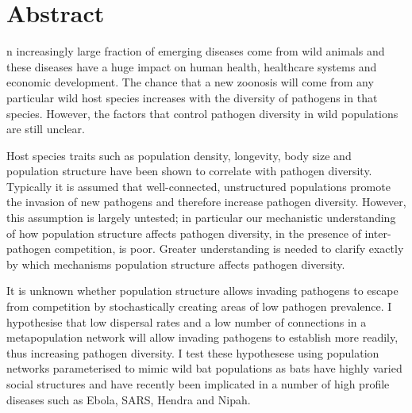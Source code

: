 
\clearpage









\section{Abstract}


n increasingly large fraction of emerging diseases come from wild animals and these diseases have a huge impact on human health, healthcare systems and economic development.
The chance that a new zoonosis will come from any particular wild host species increases with the diversity of pathogens in that species.
However, the factors that control pathogen diversity in wild populations are still unclear.




Host species traits such as population density, longevity, body size and population structure have been shown to correlate with pathogen diversity.
Typically it is assumed that well-connected, unstructured populations promote the invasion of new pathogens and therefore increase pathogen diversity. %
However, this assumption is largely untested; in particular our mechanistic understanding of how population structure affects pathogen diversity, in the presence of inter-pathogen competition, is poor.
Greater understanding is needed to clarify exactly by which mechanisms population structure affects pathogen diversity. 



It is unknown whether population structure allows invading pathogens to escape from competition by stochastically creating areas of low pathogen prevalence.
I hypothesise that low dispersal rates and a low number of connections in a metapopulation network will allow invading pathogens to establish more readily, thus increasing pathogen diversity. 
I test these hypothesese using population networks parameterised to mimic wild bat populations as bats have highly varied social structures and have recently been implicated in a number of high profile diseases such as Ebola, SARS, Hendra and Nipah.

